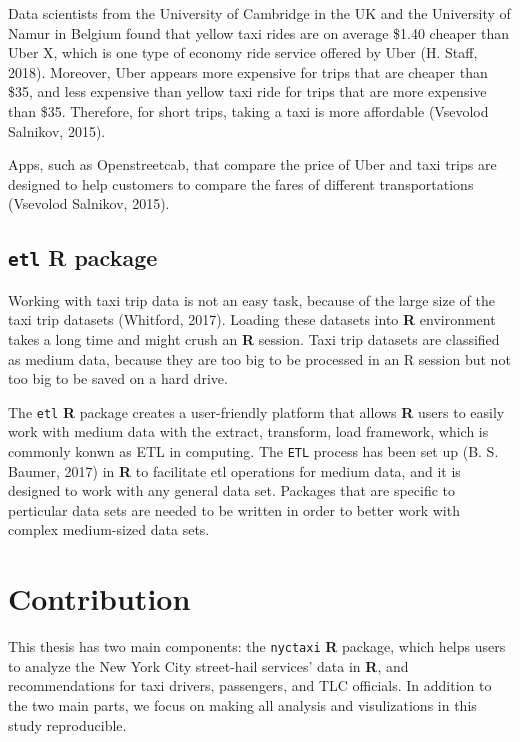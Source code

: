 \documentclass[12pt,twoside]{reedthesis}
\theoremstyle{definition}
\theoremstyle{definition}
\theoremstyle{definition}
\theoremstyle{remark}
\begin{document}
Data scientists from the University of Cambridge in the UK and the
University of Namur in Belgium found that yellow taxi rides are on
average \$1.40 cheaper than Uber X, which is one type of economy ride
service offered by Uber (H. Staff, 2018). Moreover, Uber appears more
expensive for trips that are cheaper than \$35, and less expensive than
yellow taxi ride for trips that are more expensive than \$35. Therefore,
for short trips, taking a taxi is more affordable (Vsevolod Salnikov,
2015).

Apps, such as Openstreetcab, that compare the price of Uber and taxi
trips are designed to help customers to compare the fares of different
transportations (Vsevolod Salnikov, 2015).

\subsection{\texorpdfstring{\texttt{etl} R
package}{etl R package}}\label{etl-r-package}

Working with taxi trip data is not an easy task, because of the large
size of the taxi trip datasets (Whitford, 2017). Loading these datasets
into \textbf{R} environment takes a long time and might crush an
\textbf{R} session. Taxi trip datasets are classified as medium data,
because they are too big to be processed in an R session but not too big
to be saved on a hard drive.

The \texttt{etl} \textbf{R} package creates a user-friendly platform
that allows \textbf{R} users to easily work with medium data with the
extract, transform, load framework, which is commonly konwn as ETL in
computing. The \texttt{ETL} process has been set up (B. S. Baumer, 2017)
in \textbf{R} to facilitate etl operations for medium data, and it is
designed to work with any general data set. Packages that are specific
to perticular data sets are needed to be written in order to better work
with complex medium-sized data sets.

\section{Contribution}\label{contribution}

This thesis has two main components: the \texttt{nyctaxi} \textbf{R}
package, which helps users to analyze the New York City street-hail
services' data in \textbf{R}, and recommendations for taxi drivers,
passengers, and TLC officials. In addition to the two main parts, we
focus on making all analysis and visulizations in this study
reproducible.
\end{document}
